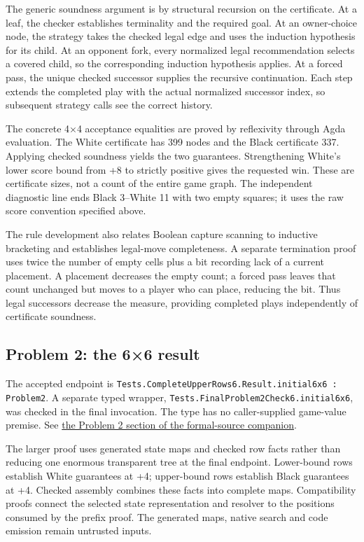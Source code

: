 \documentclass[10pt,a4paper]{article}
\newcommand{\code}[1]{\nolinkurl{#1}}
\begin{document}
The generic soundness argument is by structural recursion on the certificate. At a leaf, the checker establishes terminality and the required goal. At an owner-choice node, the strategy takes the checked legal edge and uses the induction hypothesis for its child. At an opponent fork, every normalized legal recommendation selects a covered child, so the corresponding induction hypothesis applies. At a forced pass, the unique checked successor supplies the recursive continuation. Each step extends the completed play with the actual normalized successor index, so subsequent strategy calls see the correct history.

The concrete 4×4 acceptance equalities are proved by reflexivity through Agda evaluation. The White certificate has 399 nodes and the Black certificate 337. Applying checked soundness yields the two guarantees. Strengthening White's lower score bound from +8 to strictly positive gives the requested win. These are certificate sizes, not a count of the entire game graph. The independent diagnostic line ends Black 3–White 11 with two empty squares; it uses the raw score convention specified above.

The rule development also relates Boolean capture scanning to inductive bracketing and establishes legal-move completeness. A separate termination proof uses twice the number of empty cells plus a bit recording lack of a current placement. A placement decreases the empty count; a forced pass leaves that count unchanged but moves to a player who can place, reducing the bit. Thus legal successors decrease the measure, providing completed plays independently of certificate soundness.

\subsection{Problem 2: the 6×6 result}

The accepted endpoint is \code{Tests.CompleteUpperRows6.Result.initial6x6 : Problem2}. A separate typed wrapper, \code{Tests.FinalProblem2Check6.initial6x6}, was checked in the final invocation. The type has no caller-supplied game-value premise. See \href{formal-source.html\#p2-initial6x6}{the Problem 2 section of the formal-source companion}.

The larger proof uses generated state maps and checked row facts rather than reducing one enormous transparent tree at the final endpoint. Lower-bound rows establish White guarantees at +4; upper-bound rows establish Black guarantees at +4. Checked assembly combines these facts into complete maps. Compatibility proofs connect the selected state representation and resolver to the positions consumed by the prefix proof. The generated maps, native search and code emission remain untrusted inputs.
\end{document}
